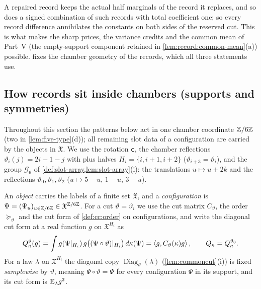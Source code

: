A repaired record keeps the actual half marginals of the record it replaces,
and so does a signed combination of such records with total coefficient one;
so every record difference annihilates the constants on both sides of the
reserved cut. This is what makes the sharp prices, the variance credits and
the common mean of Part~V (the empty-support component retained
in \cref{lem:record:common-mean}(a)) possible.  fixes the
chamber geometry of the records, which all three statements use.

\subsection{How records sit inside chambers (supports and symmetries)}\label{subsec:chamber-geometry}

Throughout this section the patterns below act in one chamber
coordinate $\mathbb Z/6\mathbb Z$ (two in \cref{lem:five-type}(d)); all remaining slot data
of a configuration are carried by the objects in $\mathfrak X$. We use the
rotation $\mathsf c$, the chamber reflections $\vartheta_i(j)=2i-1-j$ with plus
halves $H_i=\{i,i+1,i+2\}$ ($\vartheta_{i+3}=\vartheta_i$), and the group
$\mathcal G_6$ of \cref{def:slot-array,lem:slot-array}(i): the translations
$u\mapsto u+2k$ and the reflections $\vartheta_0,\vartheta_1,\vartheta_2$
($u\mapsto5-u$, $1-u$, $3-u$).

An \emph{object} carries the labels of a finite set $\mathfrak X$, and a
\emph{configuration} is $\Psi=(\Psi_u)_{u\in\mathbb Z/6\mathbb Z}\in\mathfrak X^{\mathbb Z/6\mathbb Z}$. For a
cut $\vartheta=\vartheta_i$ we use the cut matrix $C_\vartheta$, the order
$\succeq_\vartheta$ and the cut form of \cref{def:cc:order} on configurations, and
write the diagonal cut form at a real function $g$ on $\mathfrak X^{H_i}$ as
\[
 Q^{\vartheta}_\kappa(g)=\int g(\Psi|_{H_i})\,g\bigl((\Psi\circ\vartheta)|_{H_i}\bigr)
 \,d\kappa(\Psi)=\left\langle g,C_\vartheta(\kappa)g\right\rangle,\qquad Q_\kappa=Q^{\vartheta_0}_\kappa .
\]
For a law $\lambda$ on $\mathfrak X^{H_i}$ the diagonal copy
$\operatorname{Diag}_\vartheta(\lambda)$
(\cref{lem:commoncut}(i)) is fixed \emph{samplewise} by
$\vartheta$, meaning $\Psi\circ\vartheta=\Psi$ for every
configuration $\Psi$ in its support, and its cut form is
$\mathbb E_\lambda g^2$.

